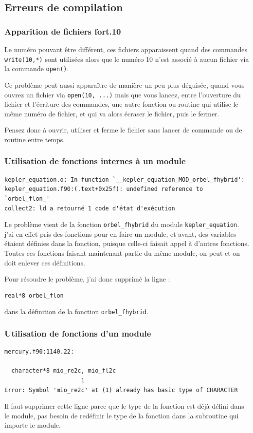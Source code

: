 \documentclass[a4paper,twoside]{article}
\begin{document}
\subsection{Erreurs de compilation}
\subsubsection{Apparition de fichiers fort.10}
Le numéro pouvant être différent, ces fichiers apparaissent quand des commandes \texttt{write(10,*)} sont utilisées alors que le numéro 10 n'est associé à aucun fichier via la commande \texttt{open()}. 

Ce problème peut aussi apparaître de manière un peu plus déguisée, quand vous ouvrez un fichier via \texttt{open(10, ...)} mais que vous lancez, entre l'ouverture du fichier et l'écriture des commandes, une autre fonction ou routine qui utilise le même numéro de fichier, et qui va alors écraser le fichier, puis le fermer. 

Pensez donc à ouvrir, utiliser et ferme le fichier sans lancer de commande ou de routine entre temps.
\subsubsection{Utilisation de fonctions internes à un module}
\begin{verbatim}
kepler_equation.o: In function `__kepler_equation_MOD_orbel_fhybrid':
kepler_equation.f90:(.text+0x25f): undefined reference to `orbel_flon_'
collect2: ld a retourné 1 code d'état d'exécution
\end{verbatim}

Le problème vient de la fonction \verb|orbel_fhybrid| du module \verb|kepler_equation|. j'ai en effet pris des fonctions pour en faire un module, et avant, des variables étaient définies dans la fonction, puisque celle-ci faisait appel à d'autres fonctions. Toutes ces fonctions faisant maintenant partie du même module, on peut et on doit enlever ces définitions. 

Pour résoudre le problème, j'ai donc supprimé la ligne : 
\begin{verbatim}
real*8 orbel_flon
\end{verbatim}
dans la définition de la fonction \verb|orbel_fhybrid|.

\subsubsection{Utilisation de fonctions d'un module}
\begin{verbatim}
mercury.f90:1140.22:

  character*8 mio_re2c, mio_fl2c
                      1
Error: Symbol 'mio_re2c' at (1) already has basic type of CHARACTER
\end{verbatim}
Il faut supprimer cette ligne parce que le type de la fonction est déjà défini dans le module, pas besoin de redéfinir le type de la fonction dans la subroutine qui importe le module.
\end{document}

